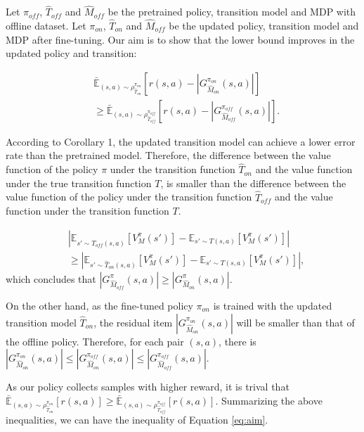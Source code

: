 \documentclass[conference]{IEEEtran}
\begin{document}
Let $\pi_{off}$, $\hat{T}_{off}$ and $\hat{M}_{off}$ be the pretrained policy, transition model and MDP with offline dataset. Let $\pi_{on}$, $\hat{T}_{on}$ and $\hat{M}_{off}$ be the updated policy, transition model and MDP after fine-tuning. Our aim is to show that the lower bound improves in the updated policy and transition:

\begin{equation}
\begin{aligned}
  \label{eq:aim}
  &\bar{\mathbb{E}}_{(s,a)\sim \rho^{\pi_{on}}_{\hat{T}_{on}}} [ r(s,a)- |G^{\pi_{on}}_{\hat{M}_{on}} (s, a) |] \\ &\geq \bar{\mathbb{E}}_{(s,a)\sim \rho^{\pi_{off}}_{\hat{T}_{off}}} [ r(s,a)- |G^{\pi_{off}}_{\hat{M}_{off}} (s, a) |].
\end{aligned}
\end{equation}

According to Corollary 1, the updated transition model can achieve a lower error rate than the pretrained model. Therefore, the difference between the value function of the policy $\pi$ under the transition function $\hat{T}_{on}$ and the value function under the true transition function $T$, is smaller than the difference between the value function of the policy under the transition function $\hat{T}_{off}$ and the value function under the transition function $T$.

\begin{equation}
  \begin{aligned}
    &|\mathbb{E}_{s'\sim\hat{T}_{off}(s,a)}  [V^{\pi}_{M} (s')] - \mathbb{E}_{s'\sim T (s,a)} [V^{\pi}_{M} (s')]| \\
    &\geq |\mathbb{E}_{s'\sim\hat{T}_{on}(s,a)}  [V^{\pi}_{M} (s')] - \mathbb{E}_{s'\sim T (s,a)} [V^{\pi}_{M} (s')]|,
  \end{aligned}
  \end{equation}
which concludes that $|G^{\pi}_{\hat{M}_{off}} (s, a) |\geq |G^{\pi}_{\hat{M}_{on}} (s, a) |$.

On the other hand, as the fine-tuned policy $\pi_{on}$ is trained with the updated transition model $\hat{T}_{on}$, the residual item $|G^{\pi_{on}}_{\hat{M}_{on}} (s, a) |$ will be smaller than that of the offline policy. Therefore, for each pair $(s,a)$, there is $|G^{\pi_{on}}_{\hat{M}_{on}} (s, a) |\leq |G^{\pi_{off}}_{\hat{M}_{on}} (s, a) | \leq |G^{\pi_{off}}_{\hat{M}_{off}} (s, a) |$.

As our policy collects samples with higher reward, it is trival that $\bar{\mathbb{E}}_{(s,a)\sim \rho^{\pi_{on}}_{\hat{T}_{on}}} [ r(s,a)] \geq \bar{\mathbb{E}}_{(s,a)\sim \rho^{\pi_{off}}_{\hat{T}_{off}}} [ r(s,a)]$. Summarizing the above inequalities, we can have the inequality of Equation \ref{eq:aim}.



\end{document}
